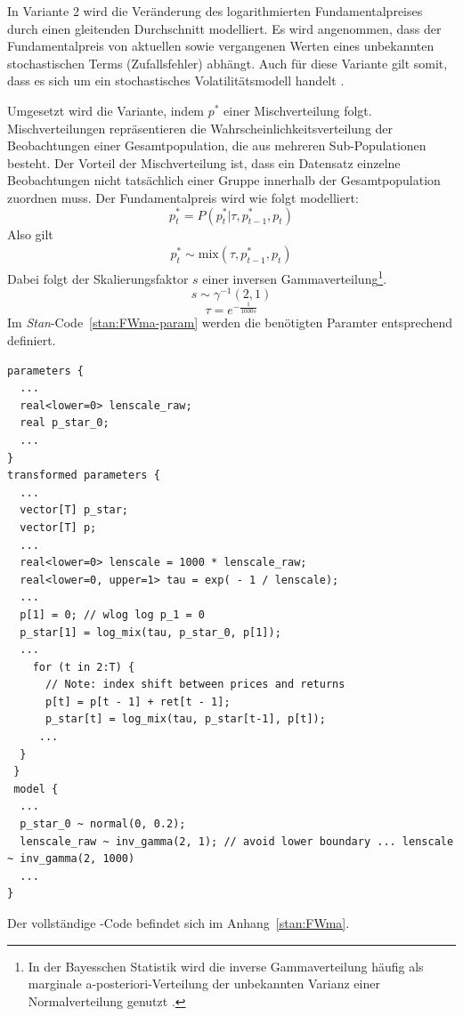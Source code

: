\documentclass[ngerman]{ttlab-qualify}
\begin{document}
In Variante 2 wird die Veränderung des logarithmierten Fundamentalpreises durch einen gleitenden Durchschnitt modelliert. Es wird angenommen, dass der Fundamentalpreis von aktuellen sowie vergangenen Werten eines unbekannten stochastischen Terms (Zufallsfehler) abhängt. Auch für diese Variante gilt somit, dass es sich um ein stochastisches Volatilitätsmodell handelt \parencite{bertschinger:2018}. 

Umgesetzt wird die Variante, indem $p^*$ einer Mischverteilung folgt. Mischverteilungen repräsentieren die Wahrscheinlichkeitsverteilung der Beobachtungen einer Gesamtpopulation, die aus mehreren Sub-Populationen besteht. Der Vorteil der Mischverteilung ist, dass ein Datensatz einzelne Beobachtungen nicht tatsächlich einer Gruppe innerhalb der Gesamtpopulation zuordnen muss.
Der Fundamentalpreis wird wie folgt modelliert:
\[p_t^* = P(p_t^*|\tau,p_{t-1}^*,p_t)\]
Also gilt
\begin{align}
p_t^*\sim\text{mix}(\tau,p_{t-1}^*,p_t)\nonumber
\end{align}
Dabei folgt der Skalierungsfaktor $s$ einer inversen Gammaverteilung\footnote{In der Bayesschen Statistik wird die inverse Gammaverteilung häufig als marginale a-posteriori-Verteilung der unbekannten Varianz einer Normalverteilung genutzt \parencite{inversgamma}.}.
\[s\sim \gamma^{-1}(2,1)\]
\[\tau =e^{-\frac{1}{1000 s}}\]
Im \textit{Stan}-Code~\ref{stan:FWma-param} werden die benötigten Paramter entsprechend definiert.

\begin{lstlisting}[style=custom, caption={Teil-Modell(Moving Average) nach \parencite{bertschinger:2018,FW:2011}},label={stan:FWma-param}]
parameters {
  ...
  real<lower=0> lenscale_raw;  
  real p_star_0;
  ...
}
transformed parameters {
  ...
  vector[T] p_star;
  vector[T] p;
  ...
  real<lower=0> lenscale = 1000 * lenscale_raw;
  real<lower=0, upper=1> tau = exp( - 1 / lenscale);
  ...
  p[1] = 0; // wlog log p_1 = 0
  p_star[1] = log_mix(tau, p_star_0, p[1]);
  ...
    for (t in 2:T) {
      // Note: index shift between prices and returns
      p[t] = p[t - 1] + ret[t - 1];
      p_star[t] = log_mix(tau, p_star[t-1], p[t]);
     ...
  }
 }
 model {
  ...
  p_star_0 ~ normal(0, 0.2);
  lenscale_raw ~ inv_gamma(2, 1); // avoid lower boundary ... lenscale ~ inv_gamma(2, 1000)
  ...
}
\end{lstlisting}

Der vollständige -Code befindet sich im Anhang~\ref{stan:FWma}.\\
\end{document}
